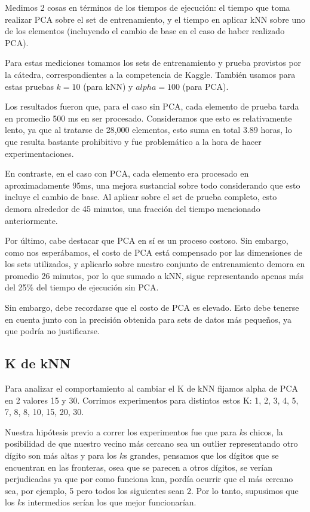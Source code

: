Medimos 2 cosas en términos de los tiempos de ejecución: el tiempo que toma realizar PCA sobre el set de entrenamiento, y el tiempo en aplicar kNN sobre uno de los elementos (incluyendo el cambio de base en el caso de haber realizado PCA).

Para estas mediciones tomamos los sets de entrenamiento y prueba provistos por la cátedra, correspondientes a la competencia de Kaggle. También usamos para estas pruebas $k = 10$ (para kNN) y $alpha = 100$ (para PCA). 

Los resultados fueron que, para el caso sin PCA, cada elemento de prueba tarda en promedio 500 ms en ser procesado. Consideramos que esto es relativamente lento, ya que al tratarse de 28,000 elementos, esto suma en total 3.89 horas, lo que resulta bastante prohibitivo y fue problemático a la hora de hacer experimentaciones.

En contraste, en el caso con PCA, cada elemento era procesado en aproximadamente 95ms, una mejora sustancial sobre todo considerando que esto incluye el cambio de base. Al aplicar sobre el set de prueba completo, esto demora alrededor de 45 minutos, una fracción del tiempo mencionado anteriormente.

Por último, cabe destacar que PCA en sí es un proceso costoso. Sin embargo, como nos esperábamos, el costo de PCA está compensado por las dimensiones de los sets utilizados, y aplicarlo sobre nuestro conjunto de entrenamiento demora en promedio 26 minutos, por lo que sumado a kNN, sigue representando apenas más del 25\% del tiempo de ejecución sin PCA.

Sin embargo, debe recordarse que el costo de PCA es elevado. Esto debe tenerse en cuenta junto con la precisión obtenida para sets de datos más pequeños, ya que podría no justificarse.

\subsection{K de kNN}

Para analizar el comportamiento al cambiar el K de kNN fijamos alpha de PCA en 2 valores 15 y 30. Corrimos experimentos para distintos estos K: 1, 2, 3, 4, 5, 7, 8, 8, 10, 15, 20, 30.

Nuestra hipótesis previo a correr los experimentos fue que para $k$s chicos, la posibilidad de que nuestro vecino más cercano sea un outlier representando otro dígito son más altas y para los $k$s grandes, pensamos que los dígitos que se encuentran en las fronteras, osea que se parecen a otros dígitos, se verían perjudicadas ya que por como funciona knn, pordía ocurrir que el más cercano sea, por ejemplo, 5 pero todos los siguientes sean 2. Por lo tanto, supusimos que los $k$s intermedios serían los que mejor funcionarían.

